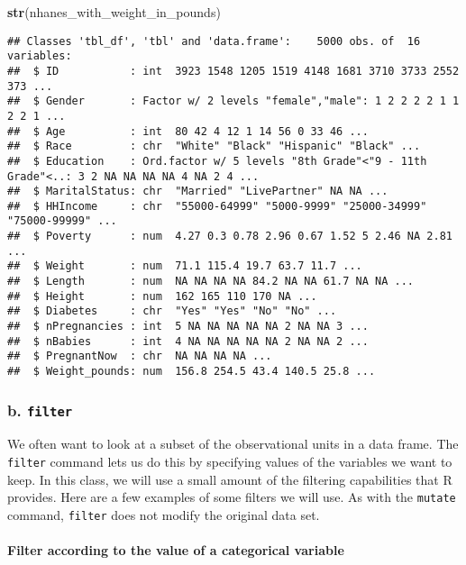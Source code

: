 \documentclass[]{article}
\newenvironment{Shaded}{\begin{snugshade}}{\end{snugshade}}
\newcommand{\KeywordTok}[1]{\textcolor[rgb]{0.13,0.29,0.53}{\textbf{#1}}}
\newcommand{\NormalTok}[1]{#1}
\let\oldparagraph\paragraph
\renewcommand{\paragraph}[1]{\oldparagraph{#1}\mbox{}}
\begin{document}
\begin{Shaded}
\begin{Highlighting}[]
\KeywordTok{str}\NormalTok{(nhanes_with_weight_in_pounds)}
\end{Highlighting}
\end{Shaded}

\begin{verbatim}
## Classes 'tbl_df', 'tbl' and 'data.frame':    5000 obs. of  16 variables:
##  $ ID           : int  3923 1548 1205 1519 4148 1681 3710 3733 2552 373 ...
##  $ Gender       : Factor w/ 2 levels "female","male": 1 2 2 2 2 1 1 2 2 1 ...
##  $ Age          : int  80 42 4 12 1 14 56 0 33 46 ...
##  $ Race         : chr  "White" "Black" "Hispanic" "Black" ...
##  $ Education    : Ord.factor w/ 5 levels "8th Grade"<"9 - 11th Grade"<..: 3 2 NA NA NA NA 4 NA 2 4 ...
##  $ MaritalStatus: chr  "Married" "LivePartner" NA NA ...
##  $ HHIncome     : chr  "55000-64999" "5000-9999" "25000-34999" "75000-99999" ...
##  $ Poverty      : num  4.27 0.3 0.78 2.96 0.67 1.52 5 2.46 NA 2.81 ...
##  $ Weight       : num  71.1 115.4 19.7 63.7 11.7 ...
##  $ Length       : num  NA NA NA NA 84.2 NA NA 61.7 NA NA ...
##  $ Height       : num  162 165 110 170 NA ...
##  $ Diabetes     : chr  "Yes" "Yes" "No" "No" ...
##  $ nPregnancies : int  5 NA NA NA NA NA 2 NA NA 3 ...
##  $ nBabies      : int  4 NA NA NA NA NA 2 NA NA 2 ...
##  $ PregnantNow  : chr  NA NA NA NA ...
##  $ Weight_pounds: num  156.8 254.5 43.4 140.5 25.8 ...
\end{verbatim}

\subsubsection{\texorpdfstring{b.
\texttt{filter}}{b. filter}}\label{b.-filter}

We often want to look at a subset of the observational units in a data
frame. The \texttt{filter} command lets us do this by specifying values
of the variables we want to keep. In this class, we will use a small
amount of the filtering capabilities that R provides. Here are a few
examples of some filters we will use. As with the \texttt{mutate}
command, \texttt{filter} does not modify the original data set.

\paragraph{Filter according to the value of a categorical
variable}\label{filter-according-to-the-value-of-a-categorical-variable}
\end{document}
